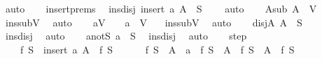 \begin{isabellebody}
\ auto\isanewline
\ \ \isamarkupfalse%
\ insert{\isachardot}{\kern0pt}prems\ \isamarkupfalse%
\ ins{\isacharunderscore}{\kern0pt}disj{\isacharcolon}{\kern0pt}\ {\isachardoublequoteopen}insert\ a\ A\ {\isasyminter}\ S\ {\isacharequal}{\kern0pt}\ {\isacharbraceleft}{\kern0pt}{\isacharbraceright}{\kern0pt}{\isachardoublequoteclose}\ \isamarkupfalse%
\ auto\isanewline
\isanewline
\ \ \isamarkupfalse%
\ A{\isacharunderscore}{\kern0pt}sub{\isacharcolon}{\kern0pt}\ {\isachardoublequoteopen}A\ {\isasymsubseteq}\ V{\isachardoublequoteclose}\ \isamarkupfalse%
\ ins{\isacharunderscore}{\kern0pt}subV\ \isamarkupfalse%
\ auto\isanewline
\ \ \isamarkupfalse%
\ aV\ \ \ {\isacharcolon}{\kern0pt}\ {\isachardoublequoteopen}a\ {\isasymin}\ V{\isachardoublequoteclose}\ \ \isamarkupfalse%
\ ins{\isacharunderscore}{\kern0pt}subV\ \isamarkupfalse%
\ auto\isanewline
\ \ \isamarkupfalse%
\ disjA{\isacharcolon}{\kern0pt}\ {\isachardoublequoteopen}A\ {\isasyminter}\ S\ {\isacharequal}{\kern0pt}\ {\isacharbraceleft}{\kern0pt}{\isacharbraceright}{\kern0pt}{\isachardoublequoteclose}\ \isamarkupfalse%
\ ins{\isacharunderscore}{\kern0pt}disj\ \isamarkupfalse%
\ auto\isanewline
\ \ \isamarkupfalse%
\ a{\isacharunderscore}{\kern0pt}notS{\isacharcolon}{\kern0pt}\ {\isachardoublequoteopen}a\ {\isasymnotin}\ S{\isachardoublequoteclose}\ \isamarkupfalse%
\ ins{\isacharunderscore}{\kern0pt}disj\ \isamarkupfalse%
\ auto\isanewline
\isanewline
\ \ \isamarkupfalse%
\ step{\isacharcolon}{\kern0pt}\isanewline
\ \ \ \ {\isachardoublequoteopen}f\ {\isacharparenleft}{\kern0pt}S\ {\isasymunion}\ insert\ a\ A{\isacharparenright}{\kern0pt}\ {\isacharminus}{\kern0pt}\ f\ S\isanewline
\ \ \ \ \ {\isacharequal}{\kern0pt}\ {\isacharparenleft}{\kern0pt}f\ {\isacharparenleft}{\kern0pt}{\isacharparenleft}{\kern0pt}S\ {\isasymunion}\ A{\isacharparenright}{\kern0pt}\ {\isasymunion}\ {\isacharbraceleft}{\kern0pt}a{\isacharbraceright}{\kern0pt}{\isacharparenright}{\kern0pt}\ {\isacharminus}{\kern0pt}\ f\ {\isacharparenleft}{\kern0pt}S\ {\isasymunion}\ A{\isacharparenright}{\kern0pt}{\isacharparenright}{\kern0pt}\ {\isacharplus}{\kern0pt}\ {\isacharparenleft}{\kern0pt}f\ {\isacharparenleft}{\kern0pt}S\ {\isasymunion}\ A{\isacharparenright}{\kern0pt}\ {\isacharminus}{\kern0pt}\ f\ S{\isacharparenright}{\kern0pt}{\isachardoublequoteclose}\isanewline

\end{isabellebody}

